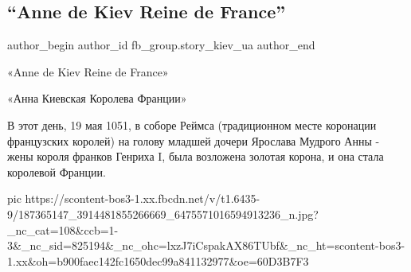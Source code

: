  
 
 
 
 
 
\subsection{\enquote{Anne de Kiev Reine de France}}
\label{sec:19_05_2021.fb.fb_group.story_kiev_ua.1.anne_reine_de_kiev}
\ifcmt
 author_begin
   author_id fb_group.story_kiev_ua
 author_end
\fi

«Anne de Kiev Reine de France»                                                 

«Анна Киевская Королева Франции»

В этот день, 19 мая 1051, в соборе Реймса (традиционном месте коронации
французских королей) на голову младшей дочери Ярослава Мудрого Анны - жены
короля франков Генриха I,  была возложена золотая корона, и она стала королевой
Франции.

\ifcmt
  pic https://scontent-bos3-1.xx.fbcdn.net/v/t1.6435-9/187365147_3914481855266669_6475571016594913236_n.jpg?_nc_cat=108&ccb=1-3&_nc_sid=825194&_nc_ohc=lxzJ7iCspakAX86TUbf&_nc_ht=scontent-bos3-1.xx&oh=b900faec142fc1650dec99a841132977&oe=60D3B7F3
\fi

